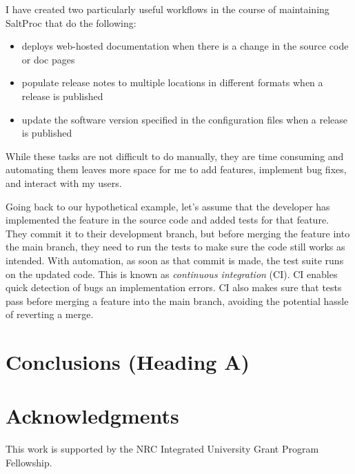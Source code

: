 \documentclass{anstrans}
\begin{document}
     I have created two particularly useful workflows in the course of maintaining SaltProc that do the following:
     \begin{itemize}
         \item deploys web-hosted documentation when there is a change in the source code or doc pages
         \item populate release notes to multiple locations in different formats when a release is published
         \item update the software version specified in the configuration files when a release is published
     \end{itemize}
     While these tasks are not difficult to do manually, they are time consuming and automating them leaves more space for me to add features, implement bug fixes, and interact with my users.
    
    Going back to our hypothetical example, let's assume that the developer has implemented the feature in the source code and added tests for that feature. They commit it to their development branch, but before merging the feature into the main branch, they need to run the tests to make sure the code still works as intended. With automation, as soon as that commit is made, the test suite runs on the updated code. This is known as {\it continuous integration} (CI). CI enables quick detection of bugs an implementation errors. CI also makes sure that tests pass before merging a feature into the main branch, avoiding the potential hassle of reverting a merge.
    

\section{Conclusions (Heading A)}



\section{Acknowledgments}
This work is supported by the NRC Integrated University Grant Program Fellowship.



\end{document}

